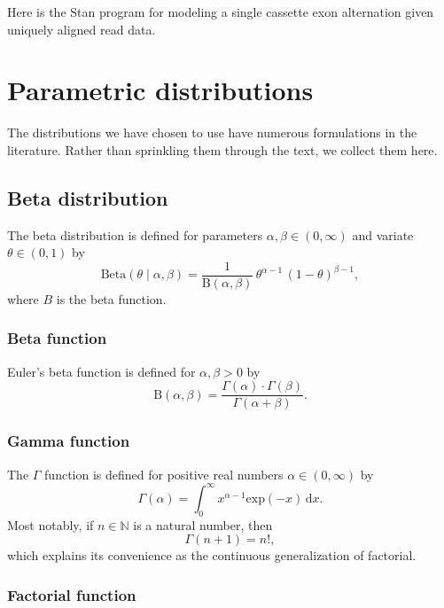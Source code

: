 \documentclass[11pt]{report}
\begin{document}
Here is the Stan program for modeling a single cassette exon
alternation given uniquely aligned read data.



\chapter{Parametric distributions}\label{chap:distributions}

The distributions we have chosen to use have numerous formulations in
the literature.  Rather than sprinkling them through the text, we
collect them here.

\section{Beta distribution}\label{sec:beta-distribution}

The beta distribution is defined for parameters $\alpha, \beta \in (0,
\infty)$ and variate $\theta \in (0, 1)$ by
\[
  \textrm{Beta}(\theta \mid \alpha, \beta)
  = \frac{1}{\textrm{B}(\alpha, \beta)}
  \, \theta^{\alpha - 1}
  \, (1 - \theta)^{\beta - 1},
\]
where $B$ is the beta function.

\subsection{Beta function}

Euler's beta function is defined for $\alpha, \beta > 0$ by
\[
  \textrm{B}(\alpha, \beta)
  = \frac{\Gamma(\alpha) \cdot \Gamma(\beta)}
         {\Gamma(\alpha + \beta)}.
\]

\subsection{Gamma function}

The $\Gamma$ function is defined for positive real numbers $\alpha \in
(0, \infty)$ by
\[
  \Gamma(\alpha) = \int_0^{\infty} x^{\alpha - 1} \textrm{exp}(-x) \, \textrm{d}x.
\]
Most notably, if $n \in \mathbb{N}$ is a natural number, then
\[
  \Gamma(n + 1) = n!,
\]
which explains its convenience as the continuous generalization of
factorial.

\subsection{Factorial function}
\end{document}
